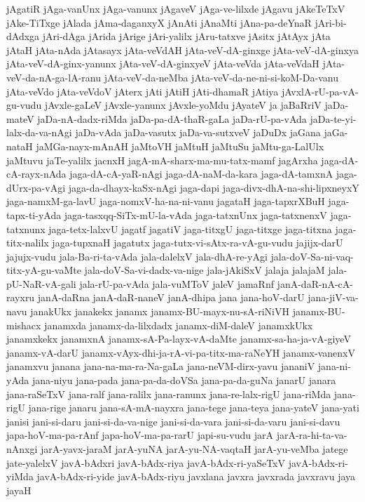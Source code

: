 {jAgatiR
jAga-vanUnx
jAga-vanunx
jAgaveV
jAga-ve-lilxde
jAgavu
jAkeTeTxV
jAke-TiTxge
jAlada
jAma-daganxyX
jAnAti
jAnaMti
jAna-pa-deYnaR
jAri-bi-dAdxga
jAri-dAga
jArida
jArige
jAri-yalilx
jAru-tatxve
jAsitx
jAtAyx
jAta
jAtaH
jAta-nAda
jAtasayx
jAta-veVdAH
jAta-veV-dA-ginxge
jAta-veV-dA-ginxya
jAta-veV-dA-ginx-yanunx
jAta-veV-dA-ginxyeV
jAta-veVda
jAta-veVdaH
jAta-veV-da-nA-ga-lA-ranu
jAta-veV-da-neMba
jAta-veV-da-ne-ni-si-koM-Da-vanu
jAta-veVdo
jAta-veVdoV
jAterx
jAti
jAtiH
jAti-dhamaR
jAtiya
jAvxlA-rU-pa-vA-gu-vudu
jAvxle-gaLeV
jAvxle-yanunx
jAvxle-yoMdu
jAyateV
ja
jaBaRriV
jaDa-mateV
jaDa-nA-dadx-riMda
jaDa-pa-dA-thaR-gaLa
jaDa-rU-pa-vAda
jaDa-te-yi-lalx-da-va-nAgi
jaDa-vAda
jaDa-vasutx
jaDa-va-sutxveV
jaDuDx
jaGana
jaGa-nataH
jaMGa-nayx-mAnAH
jaMtoVH
jaMtuH
jaMtuSu
jaMtu-ga-LalUlx
jaMtuvu
jaTe-yalilx
jacnxH
jagA-mA-sharx-ma-mu-tatx-mamf
jagArxha
jaga-dA-cA-rayx-nAda
jaga-dA-cA-yaR-nAgi
jaga-dA-naM-da-kara
jaga-dA-tamxnA
jaga-dUrx-pa-vAgi
jaga-da-dhayx-kaSx-nAgi
jaga-dapi
jaga-divx-dhA-na-shi-lipxneyxY
jaga-namxM-ga-lavU
jaga-nomxV-ha-na-ni-vanu
jagataH
jaga-tapxrXBuH
jaga-tapx-ti-yAda
jaga-tasxqq-SiTx-mU-la-vAda
jaga-tatxnUnx
jaga-tatxnenxV
jaga-tatxnunx
jaga-tetx-lalxvU
jagatf
jagatiV
jaga-titxgU
jaga-titxge
jaga-titxna
jaga-titx-nalilx
jaga-tupxnaH
jagatutx
jaga-tutx-vi-sAtx-ra-vA-gu-vudu
jajijx-darU
jajujx-vudu
jala-Ba-ri-ta-vAda
jala-dalelxV
jala-dhA-re-yAgi
jala-doV-Sa-ni-vaq-titx-yA-gu-vaMte
jala-doV-Sa-vi-dadx-va-nige
jala-jAkiSxV
jalaja
jalajaM
jala-pU-NaR-vA-gali
jala-rU-pa-vAda
jala-vuMToV
jaleV
jamaRnf
janA-daR-nA-cA-rayxru
janA-daRna
janA-daR-naneV
janA-dhipa
jana
jana-hoV-darU
jana-jiV-va-navu
janakUkx
janakekx
janamx
janamx-BU-mayx-nu-sA-riNiVH
janamx-BU-mishacx
janamxda
janamx-da-lilxdadx
janamx-diM-daleV
janamxkUkx
janamxkekx
janamxnA
janamx-sA-Pa-layx-vA-daMte
janamx-sa-ha-ja-vA-giyeV
janamx-vA-darU
janamx-vAyx-dhi-ja-rA-vi-pa-titx-ma-raNeYH
janamx-vanenxV
janamxvu
janana
jana-na-ma-ra-Na-gaLa
jana-neVM-dirx-yavu
jananiV
jana-ni-yAda
jana-niyu
jana-pada
jana-pa-da-doVSa
jana-pa-da-guNa
janarU
janara
jana-raSeTxV
jana-ralf
jana-ralilx
jana-ranunx
jana-re-lalx-rigU
jana-riMda
jana-rigU
jana-rige
janaru
jana-sA-mA-nayxra
jana-tege
jana-teya
jana-yateV
jana-yati
janisi
jani-si-daru
jani-si-da-va-nige
jani-si-da-vara
jani-si-da-varu
jani-si-davu
japa-hoV-ma-pa-rAnf
japa-hoV-ma-pa-rarU
japi-su-vudu
jarA
jarA-ra-hi-ta-va-nAnxgi
jarA-yavx-jaraM
jarA-yuNA
jarA-yu-NA-vaqtaH
jarA-yu-veMba
jatege
jate-yalelxV
javA-bAdxri
javA-bAdx-riya
javA-bAdx-ri-yaSeTxV
javA-bAdx-ri-yiMda
javA-bAdx-ri-yide
javA-bAdx-riyu
javxlana
javxra
javxrada
javxravu
jaya
jayaH
}
